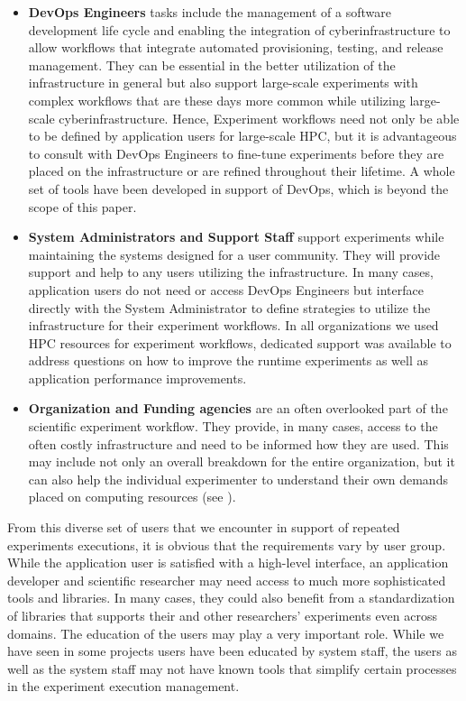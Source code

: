 \documentclass[sigconf]{acmart}
\begin{document}
\begin{itemize}
    \item {\bf DevOps Engineers} tasks include the management of a software development life cycle and enabling the integration of cyberinfrastructure to allow workflows that integrate automated provisioning, testing, and release management. They can be essential in the better utilization of the infrastructure in general but also support large-scale experiments with complex workflows that are these days more common while utilizing large-scale cyberinfrastructure. Hence, Experiment workflows need not only be able to be defined by application users for large-scale HPC, but it is advantageous to consult with DevOps Engineers to fine-tune experiments before they are placed on the infrastructure or are refined throughout their lifetime. A whole set of tools have been developed in support of DevOps, which is beyond the scope of this paper.
    \item {\bf System Administrators and Support Staff} support experiments while maintaining the systems designed for a user community. They will provide support and help to any users utilizing the infrastructure. In many cases, application users do not need or access DevOps Engineers but interface directly with the System Administrator to define strategies to utilize the infrastructure for their experiment workflows. In all organizations we used HPC resources for experiment workflows, dedicated support was available to address questions on how to improve the runtime experiments as well as application performance improvements.
    \item {\bf Organization and Funding agencies} are an often overlooked part of the scientific experiment workflow. They provide, in many cases, access to the often costly infrastructure and need to be informed how they are used. This may include not only an overall breakdown for the entire organization, but it can also help the individual experimenter to understand their own demands placed on computing resources (see \citep{las-15-tas}). 
\end{itemize}

From this diverse set of users that we encounter in support of repeated experiments executions, it is obvious that the requirements vary by user group. While the application user is satisfied with a high-level interface, an application developer and scientific researcher may need access to much more sophisticated tools and libraries. In many cases, they could also benefit from a standardization of libraries that supports their and other researchers' experiments even across domains. The education of the users may play a very important role. While we have seen in some projects users have been educated by system staff, the users as well as the system staff may not have known tools that simplify certain processes in the experiment execution management. 
\end{document}
